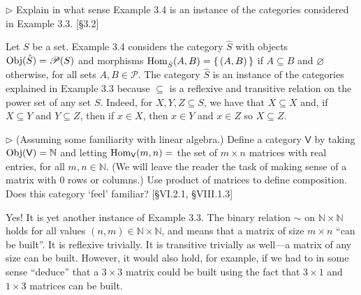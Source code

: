 \begin{problem}[3.5]
	$\rhd$ Explain in what sense Example 3.4 is an instance of the categories
	considered in Example 3.3. [\S 3.2]
\end{problem}
\begin{solution}
	Let $S$ be a set. Example 3.4 considers the category $\hat{S}$ with objects
	$\mathrm{Obj}(\hat{S}) = \mathscr{P}(S)$ and morphisms $\mathrm{Hom}_{\hat{S}}(A,B) =
	\left\{\,(A,B)\,\right\}$ if $A\subseteq B$ and $\varnothing$ otherwise, for all sets
	$A,B\in\mathscr{P}$. The category $\hat{S}$ is an instance of the categories
	explained in Example 3.3 because $\subseteq$ is a reflexive and transitive
	relation on the power set of any set $S$. Indeed, for $X,Y,Z\subseteq S$, we have
	that $X\subseteq X$ and, if $X\subseteq Y$ and $Y\subseteq Z$, then if $x\in X$,
	then $x\in Y$ and $x\in Z$ so $X\subseteq Z$.
\end{solution}


\begin{problem}[3.6]
	$\rhd$ (Assuming some familiarity with linear algebra.) Define a category
	$\mathsf{V}$ by taking $\mathrm{Obj}(\mathsf{V}) = \mathbb{N}$ and letting
	$\mathrm{Hom}_{\mathsf{V}}(m,n) = $ the set of $m\times n$ matrices with real
	entries, for all $m,n\in\mathbb{N}$. (We will leave the reader the task of
	making sense of a matrix with 0 rows or columns.) Use product of matrices to
	define composition. Does this category `feel' familiar? [\S VI.2.1, \S VIII.1.3]
\end{problem}
\begin{solution}
	Yes! It is yet another instance of Example 3.3. The binary relation $\sim$ on
	$\mathbb{N} \times \mathbb{N}$ holds for all values $(n,m)\in\mathbb{N} \times
	\mathbb{N}$, and means that a matrix of size $m\times n$ ``can be built''. It is
	reflexive trivially. It is transitive trivially as well---a matrix of any size
	can be built. However, it would also hold, for example, if we had to in some
	sense ``deduce'' that a $3\times 3$ matrix could be built using the fact that
	$3\times 1$ and $1\times 3$ matrices can be built.
\end{solution}


